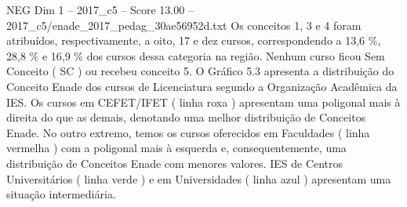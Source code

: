 \begin{textsample}{NEG Dim 1 – 2017\_c5 – Score 13.00 – 2017\_c5/enade\_2017\_pedag\_30ae56952d.txt}
Os conceitos 1, 3 e 4 foram atribuídos, respectivamente, a oito, 17 e dez cursos, correspondendo a 13,6 \%, 28,8 \% e 16,9 \% dos cursos dessa categoria na região.
Nenhum curso ficou Sem Conceito ( SC ) ou recebeu conceito 5.
O Gráfico 5.3 apresenta a distribuição do Conceito Enade dos cursos de Licenciatura segundo a Organização Acadêmica da IES.
Os cursos em CEFET/IFET ( linha roxa ) apresentam uma poligonal mais à direita do que as demais, denotando uma melhor distribuição de Conceitos Enade.
No outro extremo, temos os cursos oferecidos em Faculdades ( linha vermelha ) com a poligonal mais à esquerda e, consequentemente, uma distribuição de Conceitos Enade com menores valores.
IES de Centros Universitários ( linha verde ) e em Universidades ( linha azul ) apresentam uma situação intermediária.

\end{textsample}
